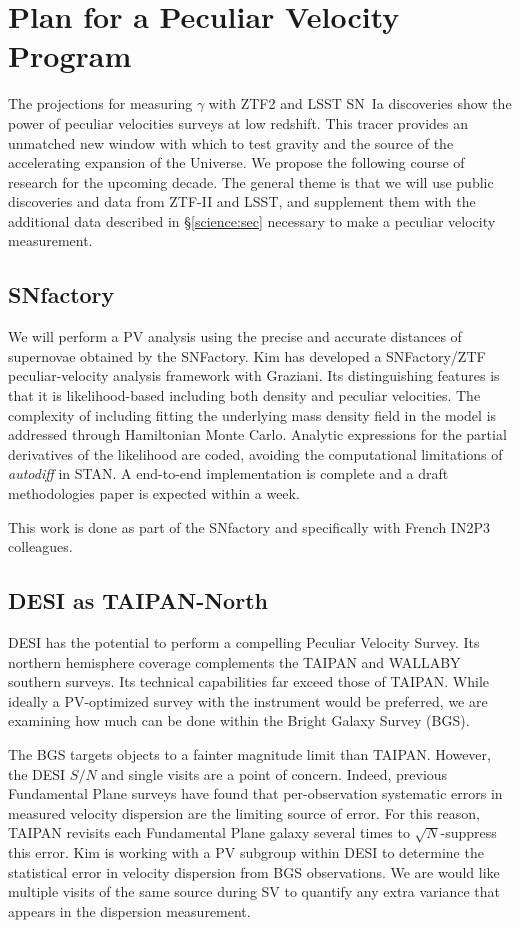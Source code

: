 \section{Plan for a Peculiar Velocity Program}
The projections for measuring $\gamma$ with ZTF2 and LSST SN~Ia discoveries
show the power of peculiar velocities surveys at low redshift.
This  tracer provides an unmatched  new window with which to test gravity and the source of the accelerating expansion of the Universe.
We propose the following course of research for the upcoming decade.  The general theme is that we will use public discoveries and data
from ZTF-II and LSST, and supplement them with the additional data  described
in \S\ref{science:sec} necessary to make a  peculiar velocity measurement.

\subsection{SNfactory}
We will perform a PV analysis using the precise and accurate distances of supernovae obtained by the SNFactory.
Kim has developed a SNFactory/ZTF peculiar-velocity analysis framework with Graziani.  Its distinguishing features is that it is likelihood-based
including both density and peculiar velocities.  The complexity of including fitting the underlying mass density field in the model
is addressed through Hamiltonian Monte Carlo.  Analytic expressions for the partial derivatives of the likelihood are coded,
avoiding the computational limitations of {\it autodiff} in STAN.  A end-to-end implementation is complete
and a draft methodologies paper is expected within a week.


This work is done as part of the SNfactory and specifically with French IN2P3 colleagues.

\subsection{DESI as TAIPAN-North}

DESI has the potential to perform a compelling Peculiar Velocity Survey.  Its northern hemisphere coverage complements 
the TAIPAN and WALLABY southern surveys.   Its technical capabilities far exceed those of TAIPAN.  While ideally a PV-optimized
survey with the instrument would be preferred, we are examining how much can be done within the Bright Galaxy Survey (BGS).

The BGS targets objects to a fainter magnitude limit than TAIPAN.  However, the DESI $S/N$ and single visits are a point of concern.
Indeed, previous Fundamental Plane surveys have found that per-observation systematic errors in measured velocity dispersion are the limiting
source of error.  For this reason, TAIPAN revisits each Fundamental Plane galaxy several times to $\sqrt{N}$-suppress this error.
Kim is working with a PV subgroup within DESI to determine the statistical error in velocity dispersion from BGS observations.
We are would like multiple visits of the same source during SV to quantify any extra variance that appears in
the dispersion measurement.

